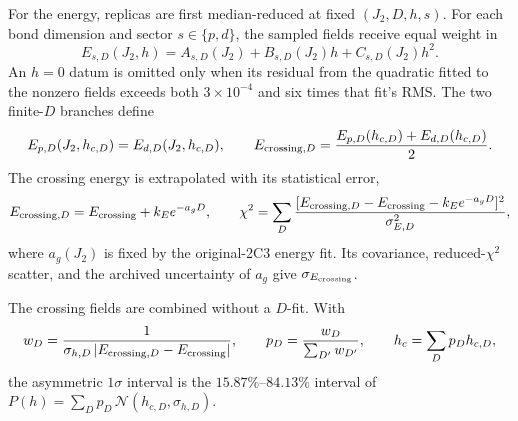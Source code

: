 \documentclass[10pt]{article}
\begin{document}
For the energy, replicas are first median-reduced at fixed $(J_2,D,h,s)$.
For each bond dimension and sector $s\in\{p,d\}$, the sampled fields receive
equal weight in
\begin{equation}
 E_{s,D}(J_2,h)=A_{s,D}(J_2)+B_{s,D}(J_2)h+C_{s,D}(J_2)h^2.
\end{equation}
An $h=0$ datum is omitted only when its residual from the quadratic fitted to
the nonzero fields exceeds both $3\times10^{-4}$ and six times that fit's RMS.
The two finite-$D$ branches define
\begin{equation}
 E_{p,D}(J_2,h_{c,D})=E_{d,D}(J_2,h_{c,D}),\qquad
 E_{{\rm crossing},D}=\frac{E_{p,D}(h_{c,D})+E_{d,D}(h_{c,D})}{2}.
\end{equation}
The crossing energy is extrapolated with its statistical error,
\begin{equation}
 E_{{\rm crossing},D}=E_{\rm crossing}+k_Ee^{-a_gD},\qquad
 \chi^2=\sum_D\frac{[E_{{\rm crossing},D}-E_{\rm crossing}
 -k_Ee^{-a_gD}]^2}{\sigma_{E,D}^2},
\end{equation}
where $a_g(J_2)$ is fixed by the original-2C3 energy fit.  Its covariance,
reduced-$\chi^2$ scatter, and the archived uncertainty of $a_g$ give
$\sigma_{E_{\rm crossing}}$.

The crossing fields are combined without a $D$-fit.  With
\begin{equation}
 w_D=\frac{1}{\sigma_{h,D}\,|E_{{\rm crossing},D}-E_{\rm crossing}|},
 \qquad p_D=\frac{w_D}{\sum_{D'}w_{D'}},\qquad
 h_c=\sum_Dp_Dh_{c,D},
\end{equation}
the asymmetric $1\sigma$ interval is the $15.87\%$--$84.13\%$ interval of
$P(h)=\sum_Dp_D\,\mathcal N(h_{c,D},\sigma_{h,D})$.
\end{document}
